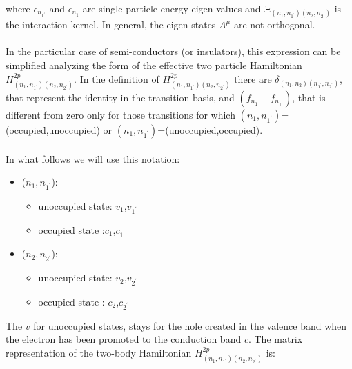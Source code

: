 \documentclass[11pt]{article}
\begin{document}
where $\epsilon_{n_{1^{\prime}}}$ and $\epsilon_{n_{1}}$ are single-particle energy eigen-values and $\Xi_{(n_{1},n_{1^{\prime}})(n_{2},n_{2^{\prime}})}$ is the interaction kernel. 
In general, the eigen-states $A^{\mu}$ are not orthogonal.
\\
\\
In the particular case of semi-conductors (or insulators), this expression can be simplified analyzing
the form of the effective two particle Hamiltonian $H^{2p}_{(n_{1},n_{1^{\prime}})(n_{2},n_{2^{\prime}})}$. In the definition of $H^{2p}_{(n_{1},n_{1^{\prime}})(n_{2},n_{2^{\prime}})}$ there
 are $\delta_{(n_{1},n_{2})(n_{1^{\prime}},n_{2^{\prime}})}$, that represent the identity
 in the transition basis, and $(f_{n_{1}} - f_{n_{1^{\prime}}})$, that is
 different from zero only for those transitions for which
 $(n_{1},n_{1^{\prime}})$=(occupied,unoccupied) or $(n_{1},n_{1^{\prime}})$=(unoccupied,occupied).\\ \\
In what follows we will use this notation:
\begin{itemize}
\item{($n_{1},n_{1^{\prime}}$):
 \begin{itemize}
 \item{ unoccupied state: $v_{1}$,$v_{1^{\prime}}$}
 \item{ occupied state :$c_{1}$,$c_{1^{\prime}}$}
 \end{itemize}
}
\item{($n_{2},n_{2^{\prime}}$):
 \begin{itemize}
 \item{ unoccupied state: $v_{2}$,$v_{2^{\prime}}$}
 \item{ occupied state : $c_{2}$,$c_{2^{\prime}}$}
 \end{itemize}
}
\end{itemize}
The $v$ for unoccupied states, stays for the hole created in the valence band when the electron has been promoted 
to the conduction band $c$.
The matrix representation of the two-body Hamiltonian $H^{2p}_{(n_{1},n_{1^{\prime}})(n_{2},n_{2^{\prime}})}$ is: 
\end{document}
